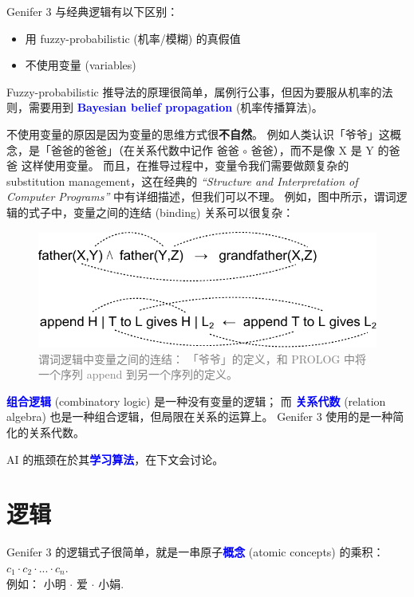 \documentclass[12pt]{article}
\newcommand{\concept}[1]{\textbf{\textcolor{blue}{#1}}}
\newcommand{\formula}[1]{\textcolor{LogicColor}{#1}}
\newcommand{\tab}{\hspace*{1cm}}
\begin{document}
Genifer 3 与经典逻辑有以下区别：
\begin{itemize}
\item 用 fuzzy-probabilistic (机率/模糊) 的真假值
\item 不使用变量 (variables)
\end{itemize}

Fuzzy-probabilistic 推导法的原理很简单，属例行公事，但因为要服从机率的法则，需要用到 \concept{Bayesian belief propagation} (机率传播算法)。

不使用变量的原因是因为变量的思维方式很\textbf{不自然}。 例如人类认识「爷爷」这概念，是「爸爸的爸爸」（在关系代数中记作 \formula{爸爸 $\circ$ 爸爸}），而不是像 \formula{X 是 Y 的爸爸} 这样使用变量。 而且，在推导过程中，变量令我们需要做颇复杂的 substitution management，这在经典的 \textit{``Structure and Interpretation of Computer Programs''} 中有详细描述，但我们可以不理。 例如，图中所示，谓词逻辑的式子中，变量之间的连结 (binding) 关系可以很复杂： 
\begin{figure}[H]
\centering
\includegraphics[scale=0.8]{connections-logic-variables.pdf}
\caption{\textcolor{grey}{谓词逻辑中变量之间的连结： 「爷爷」的定义，和 PROLOG 中将一个序列 append 到另一个序列的定义。}}
\end{figure}

\concept{组合逻辑} (combinatory logic) 是一种没有变量的逻辑；  而 \concept{关系代数} (relation algebra) 也是一种组合逻辑，但局限在关系的运算上。 Genifer 3 使用的是一种简化的关系代数。

AI 的瓶颈在於其\concept{学习算法}，在下文会讨论。

\section{逻辑}

Genifer 3 的逻辑式子很简单，就是一串原子\concept{概念} (atomic concepts) 的乘积：\\
\tab $c_1 \cdot c_2 \cdot ... \cdot c_n$.\\
例如：  \formula{小明 $\cdot$ 爱 $\cdot$ 小娟}.
\end{document}
